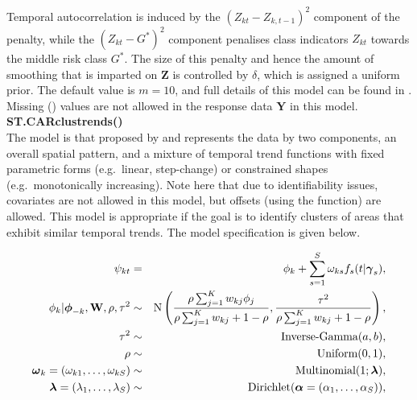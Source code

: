 \documentclass[article, nojss]{jss}
\newcommand{\bd}[1]{\ensuremath{\mbox{\boldmath $#1$}}}
\begin{document}
Temporal autocorrelation is induced by the $(Z_{kt}-Z_{k,t-1})^{2}$ component of the penalty, while the $(Z_{kt}-G^{*})^{2}$ component penalises class indicators $Z_{kt}$ towards the middle risk class $G^{*}$. The size of this penalty and hence the amount of smoothing that is imparted on $\mathbf{Z}$ is controlled by $\delta$, which is assigned a uniform prior. The default value is $m=10$, and full details of this model can be found in \cite{lee2016}. Missing () values are not allowed in the response data $\mathbf{Y}$ in this model.\\

\textbf{ST.CARclustrends()}\\
The model is that proposed by \cite{napier2018} and represents the data by two components, an overall spatial pattern, and  a mixture of temporal trend functions with fixed parametric forms (e.g.\ linear, step-change) or constrained shapes (e.g.\ monotonically increasing). Note here that due to identifiability issues, covariates are not allowed in this model, but offsets (using the  function) are allowed. This model is appropriate if the goal is to identify clusters of areas that exhibit similar temporal trends. The model specification is given below.

\begin{eqnarray}
\psi_{kt} &=& \phi_k +  \sum_{s=1}^S   \omega_{ks} f_s(t|\bd{\gamma}_s),\label{carclustrends}\\
\phi_k|\bd{\phi}_{-k},\mathbf{W},\rho, \tau^2&\sim&\mbox{N}\left(\frac{\rho\sum_{j=1}^K w_{kj}\phi_j}{\rho\sum_{j=1}^Kw_{kj} + 1-\rho}, \frac{\tau^2}{\rho\sum_{j=1}^K w_{kj} + 1-\rho}\right),\nonumber\\
\tau^2 &\sim&\mbox{Inverse-Gamma}(a,b),\nonumber\\
\rho&\sim&\mbox{Uniform}(0,1),\nonumber\\
\bd{\omega}_k= (\omega_{k1}, \ldots, \omega_{kS}) &\sim& \mbox{Multinomial}(1; \bd{\lambda}),\nonumber\\
\bd{\lambda} = (\lambda_1,\ldots,\lambda_S)&\sim&\mbox{Dirichlet}(\bd{\alpha}= (\alpha_1, \ldots, \alpha_S)),\nonumber
\end{eqnarray}
\end{document}
